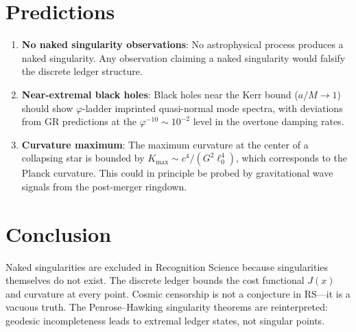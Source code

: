 \documentclass[12pt,a4paper]{article}
\theoremstyle{definition}
\theoremstyle{remark}
\begin{document}
\section{Predictions}
\label{sec:predictions}

\begin{enumerate}
  \item \textbf{No naked singularity observations}: No astrophysical
  process produces a naked singularity.  Any observation claiming a
  naked singularity would falsify the discrete ledger structure.

  \item \textbf{Near-extremal black holes}: Black holes near the Kerr
  bound ($a/M \to 1$) should show $\varphi$-ladder imprinted
  quasi-normal mode spectra, with deviations from GR predictions at
  the $\varphi^{-10} \sim 10^{-2}$ level in the overtone damping
  rates.

  \item \textbf{Curvature maximum}: The maximum curvature at the
  center of a collapsing star is bounded by
  $K_{\max} \sim c^4/(G^2 \ell_0^4)$, which corresponds to the
  Planck curvature.  This could in principle be probed by
  gravitational wave signals from the post-merger ringdown.
\end{enumerate}

\section{Conclusion}
\label{sec:conclusion}

Naked singularities are excluded in Recognition Science because
singularities themselves do not exist.  The discrete ledger bounds
the cost functional $J(x)$ and curvature at every point.  Cosmic
censorship is not a conjecture in RS---it is a vacuous truth.  The
Penrose--Hawking singularity theorems are reinterpreted: geodesic
incompleteness leads to extremal ledger states, not singular points.
\end{document}
